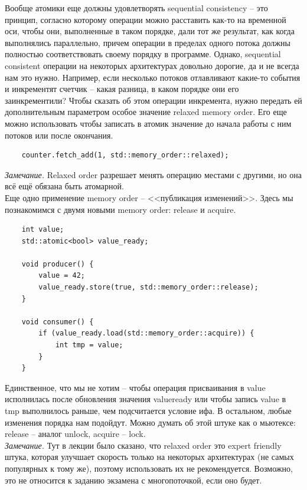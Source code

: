 \documentclass[12pt, a4paper]{article}
\begin{document}
\par Вообще атомики еще должны удовлетворять sequential consistency -- это принцип, согласно которому операции можно расставить как-то на временной оси, чтобы они, выполненные в таком порядке, дали тот же результат, как когда выполнялись параллельно, причем операции в пределах одного потока должны полностью соответствовать своему порядку в программе. Однако, sequential consistent операции на некоторых архитектурах довольно дорогие, да и не всегда нам это нужно. Например, если несколько потоков отлавливают какие-то события и инкрементят счетчик -- какая разница, в каком порядке они его заинкрементили? Чтобы сказать об этом операции инкремента, нужно передать ей дополнительным параметром особое значение relaxed memory order. Его еще можно использовать чтобы записать в атомик значение до начала работы с ним потоков или после окончания.
\begin{verbatim}
	counter.fetch_add(1, std::memory_order::relaxed);
\end{verbatim}
\textit{Замечание.} Relaxed order разрешает менять операцию местами с другими, но она всё ещё обязана быть атомарной.\\
Еще одно применение memory order -- <<публикация изменений>>. Здесь мы познакомимся с двумя новыми memory order: release и acquire.
\begin{verbatim}
	int value;
	std::atomic<bool> value_ready;
	
	void producer() {
		value = 42;
		value_ready.store(true, std::memory_order::release);
	} 
	
	void consumer() {
		if (value_ready.load(std::memory_order::acquire)) {
			int tmp = value;
		}
	}
\end{verbatim}
Единственное, что мы не хотим -- чтобы операция присваивания в value исполнилась после обновления значения value\textunderscore ready или чтобы запись value в tmp выполнилось раньше, чем подсчитается условие ифа. В остальном, любые изменения порядка нам подойдут. Можно думать об этой штуке как о мьютексе: release -- аналог unlock, acquire -- lock.\\
\textit{Замечание.} Тут в лекции было сказано, что relaxed order это expert friendly штука, которая улучшает скорость только на некоторых архитектурах (не самых популярных к тому же), поэтому использовать их не рекомендуется. Возможно, это не относится к заданию экзамена с многопоточкой, если оно будет.\\
\end{document}
